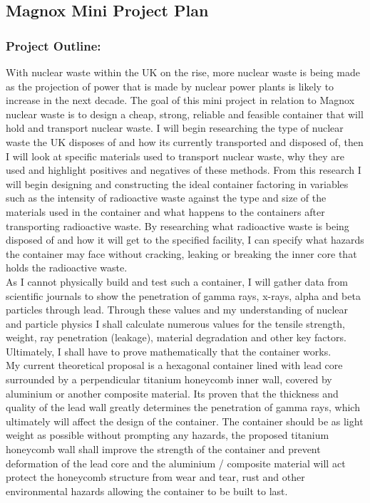 \subsection{Magnox Mini Project Plan}
\label{Project Plan SubSection}

\subsubsection*{Project Outline:}
\label{Project Outline SubSubSection}

With nuclear waste within the UK on the rise, more nuclear waste is being made as the projection of power that is made by nuclear power plants is likely to increase in the next decade. The goal of this mini project in relation to Magnox nuclear waste is to design a cheap, strong, reliable and feasible container that will hold and transport nuclear waste. I will begin researching the type of nuclear waste the UK disposes of and how its currently transported and disposed of, then I will look at specific materials used to transport nuclear waste, why they are used and highlight positives and negatives of these methods. From this research I will begin designing and constructing the ideal container factoring in variables such as the intensity of radioactive waste against the type and size of the materials used in the container and what happens to the containers after transporting radioactive waste. By researching what radioactive waste is being disposed of and how it will get to the specified facility, I can specify what hazards the container may face without cracking, leaking or breaking the inner core that holds the radioactive waste. \\

As I cannot physically build and test such a container, I will gather data from scientific journals to show the penetration of gamma rays, x-rays, alpha and beta particles through lead. Through these values and my understanding of nuclear and particle physics I shall calculate numerous values for the tensile strength, weight, ray penetration (leakage), material degradation and other key factors. Ultimately, I shall have to prove mathematically that the container works. \\

My current theoretical proposal is a hexagonal container lined with lead core surrounded by a perpendicular titanium honeycomb inner wall, covered by aluminium or another composite material. Its proven that the thickness and quality of the lead wall greatly determines the penetration of gamma rays, which ultimately will affect the design of the container. The container should be as light weight as possible without prompting any hazards, the proposed titanium honeycomb wall shall improve the strength of the container and prevent deformation of the lead core and the aluminium / composite material will act protect the honeycomb structure from wear and tear, rust and other environmental hazards allowing the container to be built to last. 

